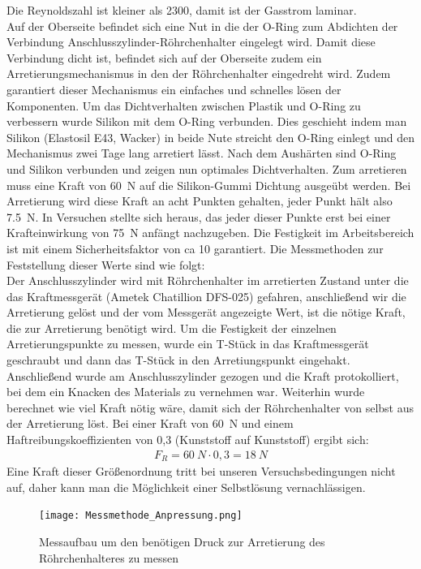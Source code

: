Die Reynoldszahl ist kleiner als 2300, damit ist der Gasstrom laminar. \\
Auf der Oberseite befindet sich eine Nut in die der O-Ring zum Abdichten der Verbindung Anschlusszylinder-Röhrchenhalter eingelegt wird. Damit diese Verbindung dicht ist, befindet sich auf der Oberseite zudem ein Arretierungsmechanismus in den der Röhrchenhalter eingedreht wird. Zudem garantiert dieser Mechanismus ein einfaches und schnelles lösen der Komponenten. Um das Dichtverhalten zwischen Plastik und O-Ring zu verbessern wurde Silikon mit dem O-Ring verbunden. Dies geschieht indem man Silikon (Elastosil E43, Wacker) in beide Nute streicht den O-Ring einlegt und den Mechanismus zwei Tage lang arretiert lässt. Nach dem Aushärten sind O-Ring und Silikon verbunden und zeigen nun optimales Dichtverhalten. 
Zum arretieren muss eine Kraft von \SI{60}{N} auf die Silikon-Gummi Dichtung ausgeübt werden. Bei Arretierung wird diese Kraft an acht Punkten gehalten, jeder Punkt hält also \SI{7,5}{N}. In Versuchen stellte sich heraus, das jeder dieser Punkte erst bei einer Krafteinwirkung von \SI{75}{N} anfängt nachzugeben. Die Festigkeit im Arbeitsbereich ist mit einem Sicherheitsfaktor von ca 10 garantiert. Die Messmethoden zur Feststellung dieser Werte sind wie folgt: \hfill \\
Der Anschlusszylinder wird mit Röhrchenhalter im arretierten Zustand unter die das Kraftmessgerät (Ametek Chatillion DFS-025) gefahren, anschließend wir die Arretierung gelöst und der vom Messgerät angezeigte Wert, ist die nötige Kraft, die zur Arretierung benötigt wird. Um die Festigkeit der einzelnen Arretierungspunkte zu messen, wurde ein T-Stück in das Kraftmessgerät geschraubt und dann das T-Stück in den Arretiungspunkt eingehakt. Anschließend wurde am Anschlusszylinder gezogen und die Kraft protokolliert, bei dem ein Knacken des Materials zu vernehmen war.
Weiterhin wurde berechnet wie viel Kraft nötig wäre, damit sich der Röhrchenhalter von selbst aus der Arretierung löst. Bei einer Kraft von \SI{60}{N} und einem Haftreibungskoeffizienten von 0,3 (Kunststoff auf Kunststoff) ergibt sich:
\begin{align*}
F_R = \SI{60}{N} \cdot 0,3 = \SI{18}{N}
\end{align*}
Eine Kraft dieser Größenordnung tritt bei unseren Versuchsbedingungen nicht auf, daher kann man die Möglichkeit einer Selbstlösung vernachlässigen.

\begin{figure}[h]
	\begin{center}
		\texttt{[image: Messmethode\_Anpressung.png]}
		\caption{Messaufbau um den benötigen Druck zur Arretierung des Röhrchenhalteres zu messen}
	\end{center}
\end{figure}

